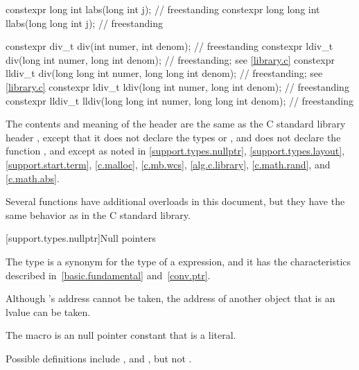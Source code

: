 \begin{codeblock}
{  constexpr long int labs(long int j);                                  // freestanding
  constexpr long long int llabs(long long int j);                       // freestanding

  constexpr div_t div(int numer, int denom);                            // freestanding
  constexpr ldiv_t div(long int numer, long int denom);                 // freestanding; see \ref{library.c}
  constexpr lldiv_t div(long long int numer, long long int denom);      // freestanding; see \ref{library.c}
  constexpr ldiv_t ldiv(long int numer, long int denom);                // freestanding
  constexpr lldiv_t lldiv(long long int numer, long long int denom);    // freestanding
}
\end{codeblock}

\pnum
The contents and meaning of the header  are the same as
the C standard library header ,
except that it does not declare the types  or ,
and does not declare the function ,
and except as noted in
\ref{support.types.nullptr},
\ref{support.types.layout},
\ref{support.start.term},
\ref{c.malloc},
\ref{c.mb.wcs},
\ref{alg.c.library},
\ref{c.math.rand}, and
\ref{c.math.abs}.
\begin{note}
Several functions have additional overloads in this document,
but they have the same behavior as in the C standard library.
\end{note}


[support.types.nullptr]{Null pointers}

\pnum
{}%
The type  is a synonym
for the type of a  expression, and it
has the characteristics
described in~\ref{basic.fundamental} and~\ref{conv.ptr}.
\begin{note}
Although 's address cannot be taken, the address of another
 object that is an lvalue can be taken.
\end{note}

\pnum
The macro
%
is an  null pointer constant
that is a literal.
\begin{footnote}
Possible definitions include
,
and
,
but not
.
\end{footnote}

